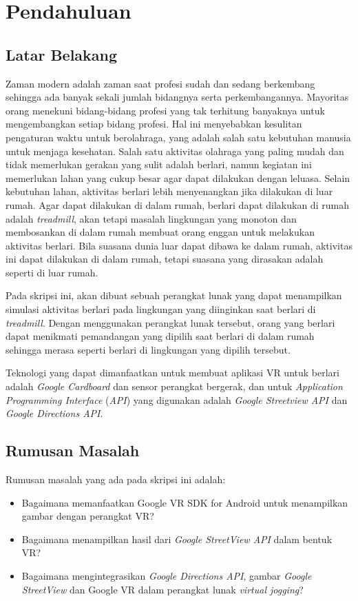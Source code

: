 \chapter{Pendahuluan}
\label{chap:intro}
   
\section{Latar Belakang}
\label{sec:label}

Zaman modern adalah zaman saat profesi sudah dan sedang berkembang sehingga ada banyak sekali jumlah bidangnya serta perkembangannya. Mayoritas orang menekuni bidang-bidang profesi yang tak terhitung banyaknya untuk mengembangkan setiap bidang profesi. Hal ini menyebabkan kesulitan pengaturan waktu untuk berolahraga, yang adalah salah satu kebutuhan manusia untuk menjaga kesehatan. Salah satu aktivitas olahraga yang paling mudah dan tidak memerlukan gerakan yang sulit adalah berlari, namun kegiatan ini memerlukan lahan yang cukup besar agar dapat dilakukan dengan leluasa. Selain kebutuhan lahan, aktivitas berlari lebih menyenangkan jika dilakukan di luar rumah. Agar dapat dilakukan di dalam rumah, berlari dapat dilakukan di rumah adalah {\it treadmill}, akan tetapi masalah lingkungan yang monoton dan membosankan di dalam rumah membuat orang enggan untuk melakukan aktivitas berlari. Bila suasana dunia luar dapat dibawa ke dalam rumah, aktivitas ini dapat dilakukan di dalam rumah, tetapi suasana yang dirasakan adalah seperti di luar rumah. 

Pada skripsi ini, akan dibuat sebuah perangkat lunak yang dapat menampilkan simulasi aktivitas berlari pada lingkungan yang diinginkan saat berlari di {\it treadmill}. Dengan menggunakan perangkat lunak tersebut, orang yang berlari dapat menikmati pemandangan yang dipilih saat berlari di dalam rumah sehingga merasa seperti berlari di lingkungan yang dipilih tersebut.

Teknologi yang dapat dimanfaatkan untuk membuat aplikasi VR untuk berlari adalah \textit{Google Cardboard} dan sensor perangkat bergerak, dan untuk {\it Application Programming Interface} (\textit{API}) yang digunakan adalah {\it Google Streetview API}  dan {\it Google Directions API}.

\section{Rumusan Masalah}
\label{sec:rumusan}
Rumusan masalah yang ada pada skripsi ini adalah:
\begin{itemize}
	\item Bagaimana memanfaatkan Google VR SDK for Android untuk menampilkan gambar dengan perangkat VR?
	\item Bagaimana menampilkan hasil dari \textit{Google StreetView API} dalam bentuk VR?
	\item Bagaimana mengintegrasikan \textit{Google Directions API}, gambar \textit{Google StreetView}  dan Google VR dalam perangkat lunak \textit{virtual jogging}?
\end{itemize}

